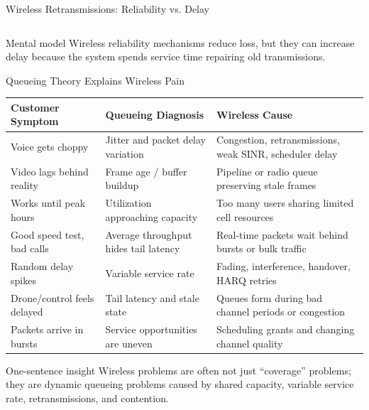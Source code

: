 \documentclass[aspectratio=169]{beamer}
\begin{document}
\begin{frame}{Wireless Retransmissions: Reliability vs. Delay}
\begin{columns}[T]
\end{columns}

\vspace{0.15cm}

\begin{alertblock}{Mental model}
Wireless reliability mechanisms reduce loss, but they can increase delay because the system spends service time repairing old transmissions.
\end{alertblock}

\end{frame}




\begin{frame}{Queueing Theory Explains Wireless Pain}
\scriptsize

\begin{tabular}{p{3.0cm} p{4.0cm} p{5.0cm}}
\toprule
\textbf{Customer Symptom} & \textbf{Queueing Diagnosis} & \textbf{Wireless Cause} \\
\midrule
Voice gets choppy & Jitter and packet delay variation & Congestion, retransmissions, weak SINR, scheduler delay \\
Video lags behind reality & Frame age / buffer buildup & Pipeline or radio queue preserving stale frames \\
Works until peak hours & Utilization approaching capacity & Too many users sharing limited cell resources \\
Good speed test, bad calls & Average throughput hides tail latency & Real-time packets wait behind bursts or bulk traffic \\
Random delay spikes & Variable service rate & Fading, interference, handover, HARQ retries \\
Drone/control feels delayed & Tail latency and stale state & Queues form during bad channel periods or congestion \\
Packets arrive in bursts & Service opportunities are uneven & Scheduling grants and changing channel quality \\
\bottomrule
\end{tabular}

\vspace{0.15cm}

\begin{alertblock}{One-sentence insight}
Wireless problems are often not just “coverage” problems; they are dynamic queueing problems caused by shared capacity, variable service rate, retransmissions, and contention.
\end{alertblock}

\end{frame}
\end{document}
